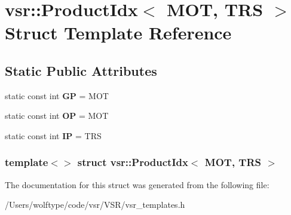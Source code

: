 \hypertarget{structvsr_1_1_product_idx_3_01_m_o_t_00_01_t_r_s_01_4}{\section{vsr\-:\-:Product\-Idx$<$ M\-O\-T, T\-R\-S $>$ Struct Template Reference}
\label{structvsr_1_1_product_idx_3_01_m_o_t_00_01_t_r_s_01_4}
}
\subsection*{Static Public Attributes}
\begin{DoxyCompactItemize}
\item 
\hypertarget{structvsr_1_1_product_idx_3_01_m_o_t_00_01_t_r_s_01_4_a9a4b8ea0ce41fd8eb5ea63eb5bee7f64}{static const int {\bfseries G\-P} = M\-O\-T}\label{structvsr_1_1_product_idx_3_01_m_o_t_00_01_t_r_s_01_4_a9a4b8ea0ce41fd8eb5ea63eb5bee7f64}

\item 
\hypertarget{structvsr_1_1_product_idx_3_01_m_o_t_00_01_t_r_s_01_4_ad4f94560b133e823bc562076b579458b}{static const int {\bfseries O\-P} = M\-O\-T}\label{structvsr_1_1_product_idx_3_01_m_o_t_00_01_t_r_s_01_4_ad4f94560b133e823bc562076b579458b}

\item 
\hypertarget{structvsr_1_1_product_idx_3_01_m_o_t_00_01_t_r_s_01_4_aa2db82288fb2af90283255eabf913b94}{static const int {\bfseries I\-P} = T\-R\-S}\label{structvsr_1_1_product_idx_3_01_m_o_t_00_01_t_r_s_01_4_aa2db82288fb2af90283255eabf913b94}

\end{DoxyCompactItemize}
\subsubsection*{template$<$$>$ struct vsr\-::\-Product\-Idx$<$ M\-O\-T, T\-R\-S $>$}



The documentation for this struct was generated from the following file\-:\begin{DoxyCompactItemize}
\item 
/\-Users/wolftype/code/vsr/\-V\-S\-R/vsr\-\_\-templates.\-h\end{DoxyCompactItemize}
